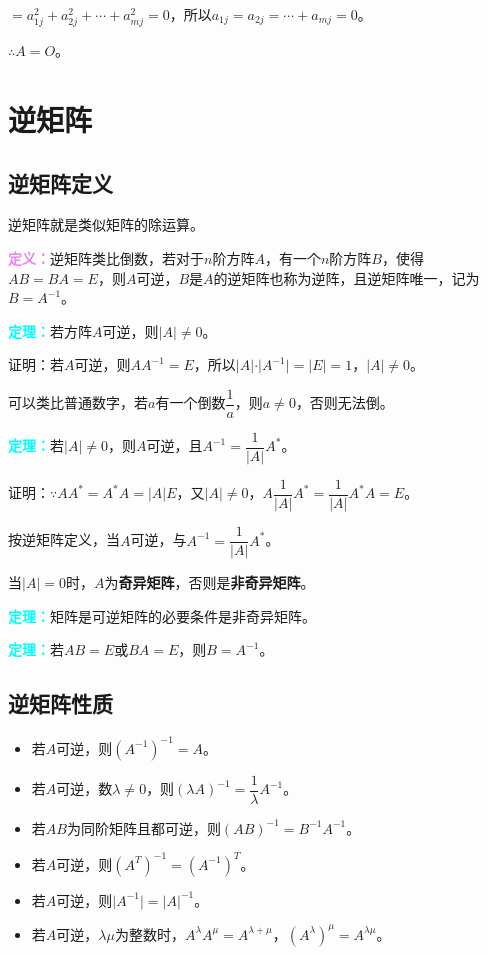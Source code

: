 \documentclass[UTF8, 12pt]{ctexart}
\begin{document}
$=a_{1j}^2+a_{2j}^2+\cdots+a_{mj}^2=0$，所以$a_{1j}=a_{2j}=\cdots+a_{mj}=0$。

$\therefore A=O$。

\section{逆矩阵}

\subsection{逆矩阵定义}

逆矩阵就是类似矩阵的除运算。

\textcolor{violet}{\textbf{定义：}}逆矩阵类比倒数，若对于$n$阶方阵$A$，有一个$n$阶方阵$B$，使得$AB=BA=E$，则$A$可逆，$B$是$A$的逆矩阵也称为逆阵，且逆矩阵唯一，记为$B=A^{-1}$。

\textcolor{aqua}{\textbf{定理：}}若方阵$A$可逆，则$\vert A\vert\neq 0$。

证明：若$A$可逆，则$AA^{-1}=E$，所以$\vert A\vert\cdot\vert A^{-1}\vert=\vert E\vert=1$，$\vert A\vert\neq 0$。

可以类比普通数字，若$a$有一个倒数$\dfrac{1}{a}$，则$a\neq 0$，否则无法倒。

\textcolor{aqua}{\textbf{定理：}}若$\vert A\vert\neq 0$，则$A$可逆，且$A^{-1}=\dfrac{1}{\vert A\vert}A^*$。

证明：$\because AA^*=A^*A=\vert A\vert E$，又$\vert A\vert\neq 0$，$A\dfrac{1}{\vert A\vert}A^*=\dfrac{1}{\vert A\vert}A^*A=E$。

按逆矩阵定义，当$A$可逆，与$A^{-1}=\dfrac{1}{\vert A\vert}A^*$。

当$\vert A\vert=0$时，$A$为\textbf{奇异矩阵}，否则是\textbf{非奇异矩阵}。

\textcolor{aqua}{\textbf{定理：}}矩阵是可逆矩阵的必要条件是非奇异矩阵。

\textcolor{aqua}{\textbf{定理：}}若$AB=E$或$BA=E$，则$B=A^{-1}$。

\subsection{逆矩阵性质}

\begin{itemize}
    \item 若$A$可逆，则$(A^{-1})^{-1}=A$。
    \item 若$A$可逆，数$\lambda\neq0$，则$(\lambda A)^{-1}=\dfrac{1}{\lambda}A^{-1}$。
    \item 若$AB$为同阶矩阵且都可逆，则$(AB)^{-1}=B^{-1}A^{-1}$。
    \item 若$A$可逆，则$(A^T)^{-1}=(A^{-1})^T$。
    \item 若$A$可逆，则$\vert A^{-1}\vert=\vert A\vert^{-1}$。
    \item 若$A$可逆，$\lambda\mu$为整数时，$A^\lambda A^\mu=A^{\lambda+\mu}$，$(A^\lambda)^\mu=A^{\lambda\mu}$。
\end{itemize}
\end{document}
